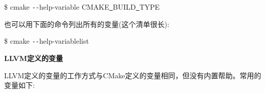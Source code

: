 \begin{tcolorbox}[colback=white,colframe=black]
\$ cmake \verb|--|help-variable CMAKE\underline{~}BUILD\underline{~}TYPE
\end{tcolorbox}

也可以用下面的命令列出所有的变量(这个清单很长):\par

\begin{tcolorbox}[colback=white,colframe=black]
\$ cmake \verb|--|help-variablelist
\end{tcolorbox}

\hspace*{\fill} \par %
\textbf{LLVM定义的变量}

LLVM定义的变量的工作方式与CMake定义的变量相同，但没有内置帮助。常用的变量如下:\par


